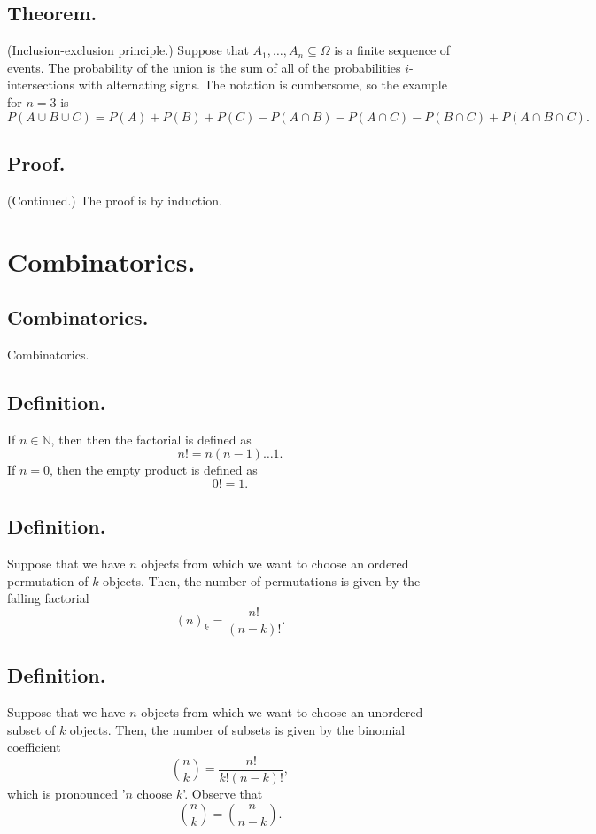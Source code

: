\documentclass[titlepage]{article}
\begin{document}
\subsection{Theorem.} (Inclusion-exclusion principle.) Suppose that $A_{1}, \ldots, A_{n} \subseteq \Omega$ is a finite sequence of events. The probability of the union is the sum of all of the probabilities $i$-intersections with alternating signs. The notation is cumbersome, so the example for $n = 3$ is 
$$P(A \cup B \cup C) = P(A) + P(B) + P(C) - P(A \cap B) - P(A \cap C) - P(B \cap C) + P(A \cap B \cap C).$$

\subsection{Proof.} (Continued.) The proof is by induction.

\newpage \section{Combinatorics.}

\subsection{Combinatorics.} Combinatorics.

\subsection{Definition.} If $n \in \mathbb{N}$, then then the factorial is defined as 
$$n! = n(n-1)\ldots1.$$
If $n = 0$, then the empty product is defined as 
$$0! = 1.$$

\subsection{Definition.} Suppose that we have $n$ objects from which we want to choose an ordered permutation of $k$ objects. Then, the number of permutations is given by the falling factorial 
$$(n)_{k} = \frac{n!}{(n-k)!}.$$

\subsection{Definition.} Suppose that we have $n$ objects from which we want to choose an unordered subset of $k$ objects. Then, the number of subsets is given by the binomial coefficient 
$$\binom{n}{k} = \frac{n!}{k!(n-k)!},$$
which is pronounced '$n$ choose $k$'. Observe that 
$$\binom{n}{k} = \binom{n}{n-k}.$$
\end{document}
